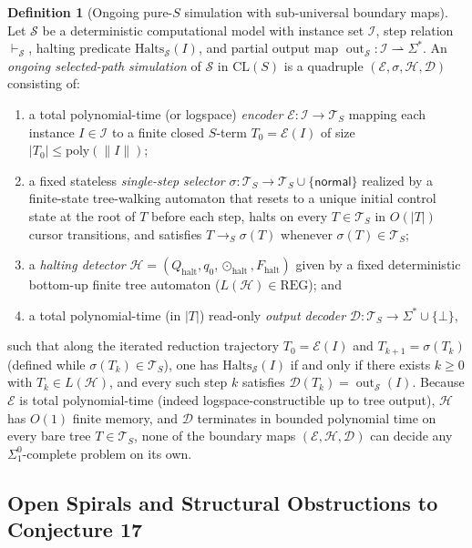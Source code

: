 \documentclass[11pt,reqno]{amsart}
\numberwithin{equation}{section}
\theoremstyle{plain}
\theoremstyle{definition}
\newtheorem{definition}[theorem]{Definition}
\theoremstyle{remark}
\DeclareMathOperator{\out}{out}
\newcommand{\CLS}{\mathrm{CL}(S)}
\newcommand{\TS}{\mathcal{T}_S}
\newcommand{\REG}{\mathrm{REG}}
\newcommand{\redS}{\to_S}
\begin{document}
\begin{definition}[Ongoing pure-$S$ simulation with sub-universal boundary maps]\label{def:ongoing-sim}
Let $\mathcal{S}$ be a deterministic computational model with instance set $\mathcal{I}$, step relation $\vdash_{\mathcal{S}}$, halting predicate $\mathrm{Halts}_{\mathcal{S}}(I)$, and partial output map $\out_{\mathcal{S}} \colon \mathcal{I} \rightharpoonup \Sigma^*$. An \emph{ongoing selected-path simulation} of $\mathcal{S}$ in $\CLS$ is a quadruple $(\mathcal{E}, \sigma, \mathcal{H}, \mathcal{D})$ consisting of:
\begin{enumerate}[label=(\roman*),leftmargin=2.2em]
  \item a total polynomial-time (or logspace) \emph{encoder} $\mathcal{E} \colon \mathcal{I} \to \TS$ mapping each instance $I \in \mathcal{I}$ to a finite closed $S$-term $T_0 = \mathcal{E}(I)$ of size $|T_0| \le \mathrm{poly}(\|I\|)$;
  \item a fixed stateless \emph{single-step selector} $\sigma \colon \TS \to \TS \cup \{\mathsf{normal}\}$ realized by a finite-state tree-walking automaton that resets to a unique initial control state at the root of $T$ before each step, halts on every $T \in \TS$ in $O(|T|)$ cursor transitions, and satisfies $T \redS \sigma(T)$ whenever $\sigma(T) \in \TS$;
  \item a \emph{halting detector} $\mathcal{H} = (Q_{\mathrm{halt}}, q_0, \odot_{\mathrm{halt}}, F_{\mathrm{halt}})$ given by a fixed deterministic bottom-up finite tree automaton ($L(\mathcal{H}) \in \REG$); and
  \item a total polynomial-time (in $|T|$) read-only \emph{output decoder} $\mathcal{D} \colon \TS \to \Sigma^* \cup \{\bot\}$,
\end{enumerate}
such that along the iterated reduction trajectory $T_0 = \mathcal{E}(I)$ and $T_{k+1} = \sigma(T_k)$ (defined while $\sigma(T_k) \in \TS$), one has $\mathrm{Halts}_{\mathcal{S}}(I)$ if and only if there exists $k \ge 0$ with $T_k \in L(\mathcal{H})$, and every such step $k$ satisfies $\mathcal{D}(T_k) = \out_{\mathcal{S}}(I)$. Because $\mathcal{E}$ is total polynomial-time (indeed logspace-constructible up to tree output), $\mathcal{H}$ has $O(1)$ finite memory, and $\mathcal{D}$ terminates in bounded polynomial time on every bare tree $T \in \TS$, none of the boundary maps $(\mathcal{E}, \mathcal{H}, \mathcal{D})$ can decide any $\Sigma_1^0$-complete problem on its own.
\end{definition}

\subsection{Open Spirals and Structural Obstructions to Conjecture 17}\label{subsec:prelim-conj17}
\end{document}
